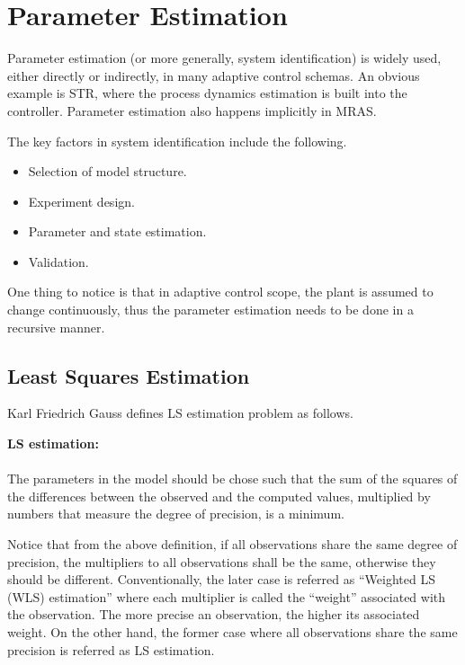 \section{Parameter Estimation}

Parameter estimation (or more generally, system identification) is widely used, either directly or indirectly, in many adaptive control schemas. An obvious example is STR, where the process dynamics estimation is built into the controller. Parameter estimation also happens implicitly in MRAS.

The key factors in system identification include the following.
\begin{itemize}
	\item Selection of model structure.
	\item Experiment design.
	\item Parameter and state estimation.
	\item Validation.
\end{itemize}

One thing to notice is that in adaptive control scope, the plant is assumed to change continuously, thus the parameter estimation needs to be done in a recursive manner.

\subsection{Least Squares Estimation}

Karl Friedrich Gauss defines LS estimation problem as follows.

\begin{mdframed}
\textbf{LS estimation:}
\\
\\
\noindent The parameters in the model should be chose such that the sum of the squares of the differences between the observed and the computed values, multiplied by numbers that measure the degree of precision, is a minimum.
\end{mdframed}

Notice that from the above definition, if all observations share the same degree of precision, the multipliers to all observations shall be the same, otherwise they should be different. Conventionally, the later case is referred as ``Weighted LS (WLS) estimation'' where each multiplier is called the ``weight'' associated with the observation. The more precise an observation, the higher its associated weight. On the other hand, the former case where all observations share the same precision is referred as LS estimation.

